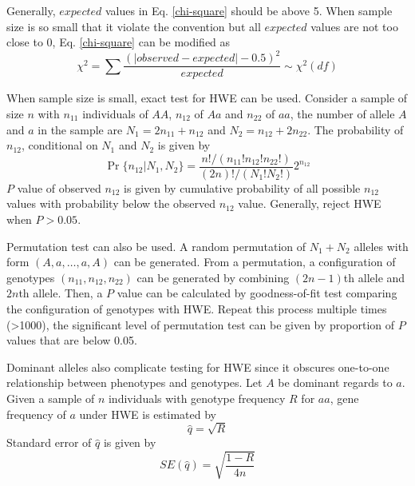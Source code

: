 \documentclass[11pt]{article}
\begin{document}
\begin{sloppypar}
\par

Generally, $expected$ values in Eq. \ref{chi-square} should be above 5. 
When sample size is so small that it violate the convention but all $expected$ values are not too close to 0, Eq. \ref{chi-square} can be modified as 
\begin{equation}
  \chi^2=\sum\frac{(\left | observed-expected \right |-0.5)^2}{expected} \sim \chi^2(df)
  \label{chi-square-modified}
\end{equation}

\par

When sample size is small, exact test for HWE can be used. 
Consider a sample of size $n$ with $n_{11}$ individuals of $AA$, $n_{12}$ of $Aa$ and $n_{22}$ of $aa$, the number of allele $A$ and $a$ in the sample are $N_1=2n_{11}+n_{12}$ and $N_2=n_{12}+2n_{22}$. 
The probability of $n_{12}$, conditional on $N_{1}$ and $N_{2}$ is given by 
\begin{equation}
  \Pr\{n_{12}|N_{1},N_{2}\}=\frac{n!/(n_{11}!n_{12}!n_{22}!)}{(2n)!/(N_1!N_2!)}2^{n_{12}}
\end{equation}
$P$ value of observed $n_{12}$ is given by cumulative probability of all possible $n_12$ values with probability below the observed $n_{12}$ value. 
Generally, reject HWE when $P>0.05$.

\par

Permutation test can also be used. 
A random permutation of $N_1+N_2$ alleles with form $(A,a,\dots,a,A)$ can be generated. 
From a permutation, a configuration of genotypes $(n_{11},n_{12},n_{22})$ can be generated by combining $(2n-1)$th allele and $2n$th allele. 
Then, a $P$ value can be calculated by goodness-of-fit test comparing the configuration of genotypes with HWE. 
Repeat this process multiple times (>1000), the significant level of permutation test can be given by proportion of $P$ values that are below 0.05.

\par

Dominant alleles also complicate testing for HWE since it obscures one-to-one relationship between phenotypes and genotypes. 
Let $A$ be dominant regards to $a$. 
Given a sample of $n$ individuals with genotype frequency $R$ for $aa$, gene frequency of $a$ under HWE is estimated by
\begin{equation}
  \hat{q}=\sqrt{R}
\end{equation}
Standard error of $\hat{q}$ is given by
\begin{equation}
  SE(\hat{q})=\sqrt{\frac{1-R}{4n}}
\end{equation}


\end{sloppypar}
\end{document}
